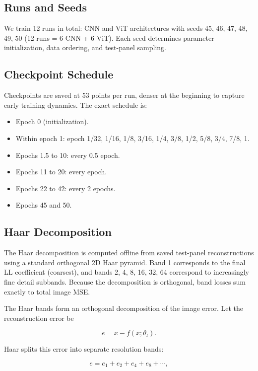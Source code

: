 \documentclass{article}
\providecommand{\tightlist}{\setlength{\itemsep}{0pt}\setlength{\parskip}{0pt}}
\begin{document}
\subsection{Runs and Seeds}\label{app:runs-seeds}

We train 12 runs in total: CNN and ViT architectures with seeds 45, 46,
47, 48, 49, 50 (12 runs = 6 CNN + 6 ViT). Each seed determines parameter
initialization, data ordering, and test-panel sampling.

\subsection{Checkpoint Schedule}\label{app:checkpoint-schedule}

Checkpoints are saved at 53 points per run, denser at the beginning to capture
early training dynamics. The exact schedule is:

\begin{itemize}
\tightlist
\item
  Epoch 0 (initialization).
\item
  Within epoch 1: epoch 1/32, 1/16, 1/8, 3/16, 1/4, 3/8, 1/2, 5/8, 3/4,
  7/8, 1.
\item
  Epochs 1.5 to 10: every 0.5 epoch.
\item
  Epochs 11 to 20: every epoch.
\item
  Epochs 22 to 42: every 2 epochs.
\item
  Epochs 45 and 50.
\end{itemize}

\subsection{Haar Decomposition}\label{app:haar-decomposition}

The Haar decomposition is computed offline from saved test-panel
reconstructions using a standard orthogonal 2D Haar pyramid. Band 1
corresponds to the final LL coefficient (coarsest), and bands 2, 4, 8,
16, 32, 64 correspond to increasingly fine detail subbands. Because the
decomposition is orthogonal, band losses sum exactly to total image MSE.

The Haar bands form an orthogonal decomposition of the image error. Let
the reconstruction error be

\[
e = x - f(x;\theta_t).
\]

Haar splits this error into separate resolution bands:

\[
e = e_1 + e_2 + e_4 + e_8 + \cdots,
\]
\end{document}
